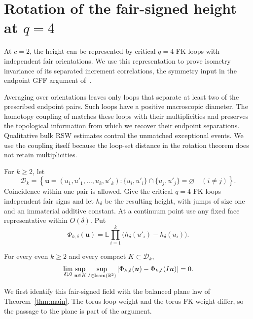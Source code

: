 \section{Rotation of the fair-signed height at \texorpdfstring{$q=4$}{q=4}}
\label{sec:endpoint-rotation}

At $c=2$, the height can be represented by critical $q=4$ FK loops
with independent fair orientations. We use this representation to prove
isometry invariance of its separated increment correlations, the symmetry
input in the endpoint GFF argument of~\cite{DKLM2026}.

Averaging over orientations leaves only loops that separate at least
two of the prescribed endpoint pairs. Such loops have a positive
macroscopic diameter. The homotopy coupling of
\cite[Sections~3.5--3.6 and~4.2]{DCKKMO2026Rotation} matches these loops
with their multiplicities and preserves the topological information
from which we recover their endpoint separations. Qualitative bulk RSW
estimates control the unmatched
exceptional events. We use the coupling itself because the loop-set
distance in the rotation theorem does not retain multiplicities.

For $k\ge2$, let
\[
 \mathcal D_k=
 \left\{\boldsymbol u=(u_1,u'_1,\ldots,u_k,u'_k):
 \{u_i,u'_i\}\cap\{u_j,u'_j\}=\varnothing\quad(i\ne j)\right\}.
\]
Coincidence within one pair is allowed.  Give the critical $q=4$ FK
loops independent fair signs and let $h_\delta$ be the resulting height,
with jumps of size one and an immaterial additive constant.  At a
continuum point use any fixed face representative within $O(\delta)$.
Put
\begin{equation}
 \Phi_{k,\delta}(\boldsymbol u)
 =\mathbb E\prod_{i=1}^k
       \bigl(h_\delta(u'_i)-h_\delta(u_i)\bigr).
 \label{eq:rr-Phi}
\end{equation}

\begin{theorem}
\label{thm:rr-rotation}
For every even $k\ge2$ and every compact $K\subset\mathcal D_k$,
\begin{equation}
 \lim_{\delta\downarrow0}
 \sup_{\boldsymbol u\in K}\sup_{I\in\operatorname{Isom}(\mathbb R^2)}
 \left|\Phi_{k,\delta}(\boldsymbol u)
             -\Phi_{k,\delta}(I\boldsymbol u)\right|=0.
 \label{eq:rr-target}
\end{equation}
\end{theorem}

We first identify this fair-signed field with the balanced plane law
of Theorem~\ref{thm:main}. The torus loop weight and the torus FK
weight differ, so the passage to the plane is part of the argument.

